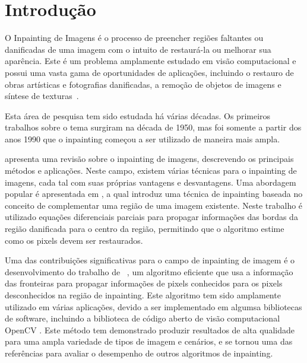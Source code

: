 
\section{Introdução} \label{introduction}
O Inpainting  de Imagens é o processo de preencher regiões faltantes ou danificadas de uma imagem com o intuito de restaurá-la ou melhorar sua aparência. Este é um problema amplamente estudado em visão computacional e possui uma vasta gama de oportunidades de aplicações, incluindo o restauro de obras artísticas e fotografias danificadas, a remoção de objetos de imagens e síntese de texturas~\cite{criminisi2004region}.

Esta área de pesquisa tem sido estudada há várias décadas. Os primeiros trabalhos sobre o tema surgiram na década de 1950, mas foi somente a partir dos anos 1990 que o inpainting começou a ser utilizado de maneira mais ampla.

\cite{Elharrouss2019} apresenta uma revisão sobre o inpainting de imagens, descrevendo os principais métodos e aplicações. Neste campo, existem várias técnicas para o inpainting de imagens, cada tal com suas próprias vantagens e desvantagens. Uma abordagem popular é apresentada em \cite{Bertalmio2000}, a qual introduz uma técnica de inpainting baseada no conceito de complementar uma região de uma imagem existente. Neste trabalho é utilizado equações diferenciais parciais para propagar informações das bordas da região danificada para o centro da região, permitindo que o algoritmo estime como os pixels devem ser restaurados.

Uma das contribuições significativas para o campo de inpainting de imagem é o desenvolvimento do trabalho de ~\cite{Telea2004}, um algoritmo eficiente que usa a informação das fronteiras para propagar informações de pixels conhecidos para os pixels desconhecidos na região de inpainting. Este algoritmo tem sido amplamente utilizado em várias aplicações, devido a ser implementado em algumsa bibliotecas de software, incluindo a biblioteca de código aberto de visão computacional OpenCV \cite{OpenCV}. Este método tem demonstrado produzir resultados de alta qualidade para uma ampla variedade de tipos de imagem e cenários, e se tornou uma das referências para avaliar o desempenho de outros algoritmos de inpainting.


